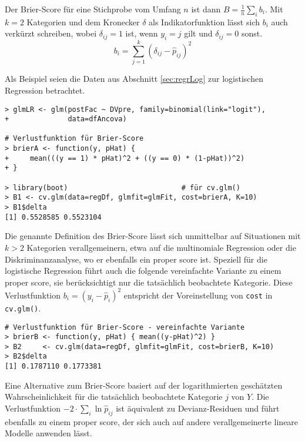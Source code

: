 Der Brier-Score für eine Stichprobe vom Umfang $n$ ist dann $B = \frac{1}{n} \sum_{i} b_{i}$. Mit $k = 2$ Kategorien und dem Kronecker $\delta$ als Indikatorfunktion lässt sich $b_{i}$ auch verkürzt schreiben, wobei $\delta_{ij} = 1$ ist, wenn $y_{i} = j$ gilt und $\delta_{ij} = 0$ sonst.
\begin{equation*}
b_{i} = \sum\limits_{j=1}^{k}(\delta_{ij} - \hat{p}_{ij})^{2}
\end{equation*}

Als Beispiel seien die Daten aus Abschnitt \ref{sec:regrLog} zur logistischen Regression betrachtet.
\begin{lstlisting}
> glmLR <- glm(postFac ~ DVpre, family=binomial(link="logit"),
+              data=dfAncova)

# Verlustfunktion für Brier-Score
> brierA <- function(y, pHat) {
+     mean(((y == 1) * pHat)^2 + ((y == 0) * (1-pHat))^2)
+ }

> library(boot)                           # für cv.glm()
> B1 <- cv.glm(data=regDf, glmfit=glmFit, cost=brierA, K=10)
> B1$delta
[1] 0.5528585 0.5523104
\end{lstlisting}

Die genannte Definition des Brier-Score lässt sich unmittelbar auf Situationen mit $k > 2$ Kategorien verallgemeinern, etwa auf die multinomiale Regression oder die Diskriminanzanalyse, wo er ebenfalls ein proper score ist. Speziell für die logistische Regression führt auch die folgende vereinfachte Variante zu einem proper score, sie berücksichtigt nur die tatsächlich beobachtete Kategorie. Diese Verlustfunktion $b_{i} = (y_{i} - \hat{p}_{i})^{2}$ entspricht der Voreinstellung von \lstinline!cost! in \lstinline!cv.glm()!.
\begin{lstlisting}
# Verlustfunktion für Brier-Score - vereinfachte Variante
> brierB <- function(y, pHat) { mean((y-pHat)^2) }
> B2     <- cv.glm(data=regDf, glmfit=glmFit, cost=brierB, K=10)
> B2$delta
[1] 0.1787110 0.1773381
\end{lstlisting}

Eine Alternative zum Brier-Score basiert auf der logarithmierten geschätzten Wahrscheinlichkeit für die tatsächlich beobachtete Kategorie $j$ von $Y$. Die Verlustfunktion $-2 \cdot \sum_{i}\ln \hat{p}_{ij}$ ist äquivalent zu Devianz-Residuen und führt ebenfalls zu einem proper score, der sich auch auf andere verallgemeinerte lineare Modelle anwenden lässt.

